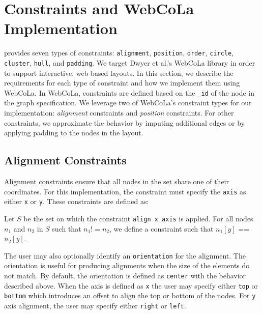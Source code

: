 \section{\projectname Constraints and WebCoLa Implementation}
\label{sec:constraints}

\projectname provides seven types of constraints:
\texttt{alignment}, \texttt{position}, \texttt{order}, \texttt{circle},
\texttt{cluster}, \texttt{hull}, and \texttt{padding}. We
target  Dwyer et al.'s WebCoLa library \cite{WebCoLa} in order to support
interactive, web-based layouts. In this section, we describe the requirements 
for each type of constraint and how we implement them using WebCoLa. 
In WebCoLa, constraints are defined based on the \texttt{\_id} of the
node in the graph specification. We leverage two of WebCoLa's
constraint types for our implementation: \emph{alignment} constraints 
and \emph{position} constraints. For other \projectname constraints, we
approximate the behavior by imputing additional edges or by applying
padding to the nodes in the layout.

\subsection{Alignment Constraints}

Alignment constraints ensure that all nodes in the set share one of their
coordinates. For this implementation, the constraint must specify the \texttt{axis}
as either \texttt{x} or \texttt{y}. These constraints are defined as:

\begin{definition}
Let $S$ be the set on which the constraint \texttt{align x axis} is applied.
For all nodes $n_1$ and $n_2$ in $S$ such that $n_1 != n_2$, we define 
a constraint such that $n_1[y]$ == $n_2[y]$.
\end{definition}



The user may also optionally identify an \texttt{orientation} for the alignment.
The orientation is useful for producing alignments when the size of the 
elements do not match. By default, the orientation is defined as \texttt{center} 
with the behavior described above. When the axis is defined as \texttt{x} 
the user may specify either \texttt{top} or \texttt{bottom} which introduces 
an offset to align the top or bottom of the nodes. For \texttt{y} axis
alignment, the user may specify either \texttt{right} or \texttt{left}.

